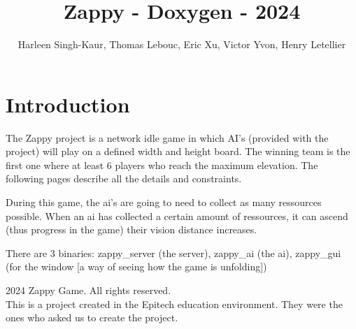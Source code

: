 \documentclass{article}
\begin{document}
\title{Zappy - Doxygen - 2024}
\author{Harleen Singh-Kaur, Thomas Lebouc, Eric Xu, Victor Yvon, Henry Letellier}
\date{}
\maketitle

\section{Introduction}
The Zappy project is a network idle game in which AI's (provided with the project) will play on a defined width and height board.
The winning team is the first one where at least 6 players who reach the maximum elevation.
The following pages describe all the details and constraints.

During this game, the ai's are going to need to collect as many ressources possible.
When an ai has collected a certain amount of ressources, it can ascend (thus progress in the game) their vision distance increases.

There are 3 binaries: zappy_server (the server), zappy_ai (the ai), zappy_gui (for the window [a way of seeing how the game is unfolding])

\lipsum[1-10]

\clearpage
\thispagestyle{empty} %
\begin{center}
    \small \textcopyright{} 2024 Zappy Game. All rights reserved. \\
    \small This is a project created in the Epitech education environment.
    \small They were the ones who asked us to create the project.
\end{center}
\end{document}
